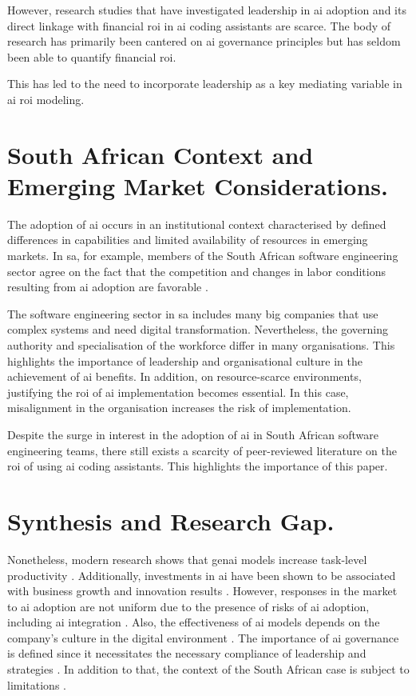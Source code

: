 However, research studies that have investigated leadership in \gls{ai} adoption and its direct linkage with financial \gls{roi} in \gls{ai} coding assistants are scarce. The body of research has primarily been cantered on \gls{ai} governance principles but has seldom been able to quantify financial \gls{roi}.

This has led to the need to incorporate leadership as a key mediating variable in \gls{ai} \gls{roi} modeling.

\section {South African Context and Emerging Market Considerations.}
\label{sec:South African Context and Emerging Market Considerations}
The adoption of \gls{ai} occurs in an institutional context characterised by defined differences in capabilities and limited availability of resources in emerging markets. In \gls{sa}, for example, members of the South African software engineering sector agree on the fact that the competition and changes in labor conditions resulting from \gls{ai} adoption are favorable \autocite{Poisat2024}. 

The software engineering sector in \gls{sa} includes many big companies that use complex systems and need digital transformation. Nevertheless, the governing authority and specialisation of the workforce differ in many organisations.
This highlights the importance of leadership and organisational culture in the achievement of \gls{ai} benefits. In addition, on resource-scarce environments, justifying the \gls{roi} of \gls{ai} implementation becomes essential. In this case, misalignment in the organisation increases the risk of implementation.

Despite the surge in interest in the adoption of \gls{ai} in South African software engineering teams, there still exists a scarcity of peer-reviewed literature on the \gls{roi} of using \gls{ai} coding assistants. This highlights the importance of this paper.

\section {Synthesis and Research Gap.}
\label{sec:Synthesis and Research Gap}
Nonetheless, modern research shows that \gls{genai} models increase task-level productivity \autocite{Noy2023}. Additionally, investments in \gls{ai} have been shown to be associated with business growth and innovation results \autocite{Babina2024}. However, responses in the market to \gls{ai} adoption are not uniform due to the presence of risks of \gls{ai} adoption, including \gls{ai} integration \autocite{Lui2021}. Also, the effectiveness of \gls{ai} models depends on the company's culture in the digital environment \autocite{An2024}. The importance of \gls{ai} governance is defined since it necessitates the necessary compliance of leadership and strategies \autocite{Schneider2023}. In addition to that, the context of the South African case is subject to limitations \autocite{Poisat2024}.

